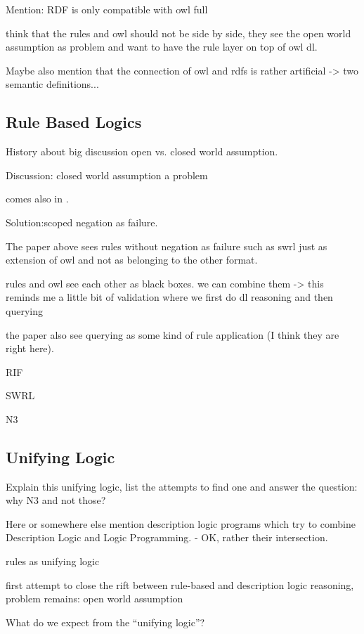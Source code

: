 Mention: RDF is only compatible with owl full

\cite{twotowers} think that the rules and owl should not be side by side, they see the open world assumption as problem and want to have the rule layer on top of owl dl.

Maybe also mention that the connection of owl and rdfs is rather artificial -> two semantic definitions...
\subsection{Rule Based Logics}

History about big discussion open vs. closed world assumption.

Discussion: closed world assumption a problem

comes also in \cite{rearch}.

Solution:scoped negation as failure.

The paper above sees rules without negation as failure such as swrl just as extension of owl and not as belonging to the other format.

rules and owl see each other as black boxes.
we can combine them
-> this reminds me a little bit of validation where we first do dl reasoning and then querying

the paper also see querying as some kind of rule application (I think they are right here).


RIF

SWRL

N3

\cite{N3Logic}

\subsection{Unifying Logic}
Explain this unifying logic, list the attempts to find one and answer the question: why N3 and not those?



Here or somewhere else mention description logic programs \cite{DLP} which try to combine Description Logic and Logic Programming. - OK, rather their intersection.

\cite{knorr} rules as unifying logic

\cite{unilogic} first attempt to close the rift between rule-based and description logic reasoning, problem remains: open world assumption


What do we expect from the ``unifying logic''?

